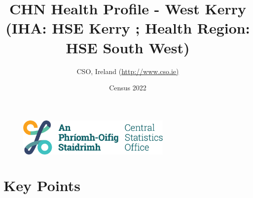 \documentclass{article}
\title{CHN Health Profile - West Kerry (IHA: HSE Kerry ;  Health Region: HSE South West) }
\date{Census 2022}
\author{CSO, Ireland  (\url{http://www.cso.ie)}}
\begin{document}


\begin{figure}
	\centering
\includegraphics[width =75mm]{../figures/CSO_Logo.png}
\end{figure}

				 
		   
						  
														  
																																													
												 
			 
\maketitle
					
													   
				 
						 
																																																																											   
				 
				  
  \pagebreak
    	    \tableofcontents

\pagebreak


\section{Key Points}
\end{document}
